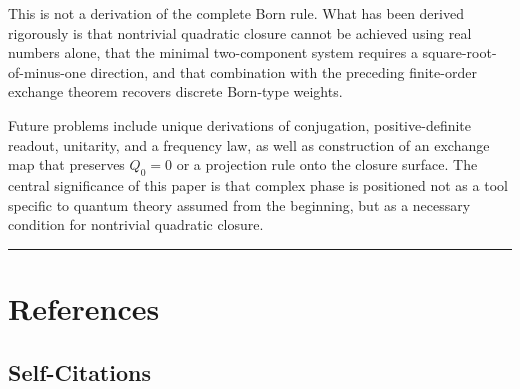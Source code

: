 \documentclass[
  a4paper,
  10pt]{article}
\begin{document}
This is not a derivation of the complete Born rule. What has been
derived rigorously is that nontrivial quadratic closure cannot be
achieved using real numbers alone, that the minimal two-component system
requires a square-root-of-minus-one direction, and that combination with
the preceding finite-order exchange theorem recovers discrete Born-type
weights.

Future problems include unique derivations of conjugation,
positive-definite readout, unitarity, and a frequency law, as well as
construction of an exchange map that preserves \(Q_0=0\) or a projection
rule onto the closure surface. The central significance of this paper is
that complex phase is positioned not as a tool specific to quantum
theory assumed from the beginning, but as a necessary condition for
nontrivial quadratic closure.

\begin{center}\rule{0.5\linewidth}{0.5pt}\end{center}

\section{References}\label{references}

\subsection{Self-Citations}\label{self-citations}
\end{document}
